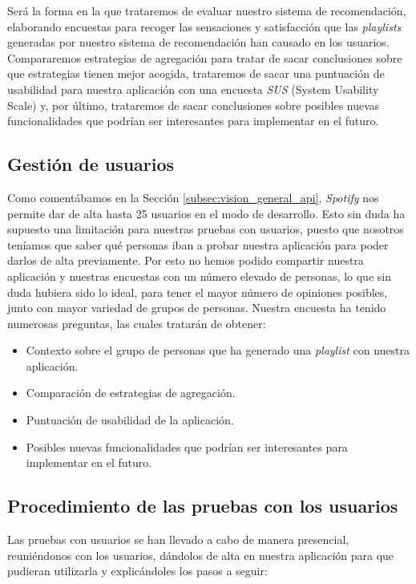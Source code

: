 Será la forma en la que trataremos de evaluar nuestro sistema de recomendación, elaborando encuestas para recoger las sensaciones y satisfacción
que las \textit{playlists} generadas por nuestro sistema de recomendación han causado en los usuarios. Compararemos estrategias de agregación para tratar de sacar conclusiones
sobre que estrategias tienen mejor acogida, trataremos de sacar una puntuación de usabilidad para nuestra aplicación 
con una encuesta \textit{SUS} (System Usability Scale) y, por último, trataremos de sacar conclusiones sobre posibles nuevas funcionalidades que podrían ser interesantes 
para implementar en el futuro.

\subsection{Gestión de usuarios\label{SEC:GESTION_USUARIOS}}

Como comentábamos en la Sección \ref{subsec:vision_general_api}, \textit{Spotify} nos permite dar de alta hasta 25 usuarios en el modo de desarrollo. Esto sin duda 
ha supuesto una limitación para nuestras pruebas con usuarios, puesto que nosotros teníamos que saber qué personas
iban a probar nuestra aplicación para poder darlos de alta previamente. Por esto no hemos podido compartir nuestra aplicación y nuestras
encuestas con un número elevado de personas, lo que sin duda hubiera sido lo ideal, para tener el mayor número de opiniones posibles, junto con mayor 
variedad de grupos de personas. Nuestra encuesta ha tenido numerosas preguntas, las cuales tratarán de obtener:

\begin{itemize}
    \item Contexto sobre el grupo de personas que ha generado una \textit{playlist} con nuestra aplicación.
    \item Comparación de estrategias de agregación.
    \item Puntuación de usabilidad de la aplicación.
    \item Posibles nuevas funcionalidades que podrían ser interesantes para implementar en el futuro.
\end{itemize}

\subsection{Procedimiento de las pruebas con los usuarios\label{SEC:PROCEDIMIENTO}}

Las pruebas con usuarios se han llevado a cabo de manera presencial, reuniéndonos con los usuarios, dándolos de alta en nuestra aplicación para que pudieran utilizarla y 
explicándoles los pasos a seguir:

